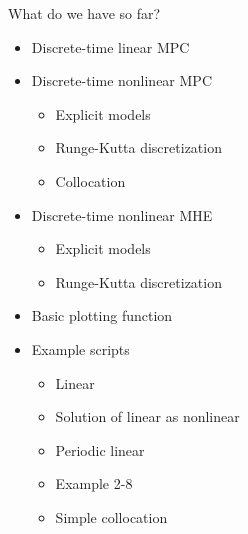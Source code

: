\documentclass[xcolor=dvipsnames]{beamer}
\begin{document}
\begin{frame}{What do we have so far?}
    \begin{itemize}
        \item Discrete-time linear MPC
        \item Discrete-time nonlinear MPC
        \begin{itemize}
            \item Explicit models
            \item Runge-Kutta discretization
            \item Collocation
        \end{itemize}
        \item Discrete-time nonlinear MHE
        \begin{itemize}
            \item Explicit models
            \item Runge-Kutta discretization
        \end{itemize}
        \item Basic plotting function
        \item Example scripts
        \begin{itemize}
            \item Linear
            \item Solution of linear as nonlinear
            \item Periodic linear
            \item Example 2-8
            \item Simple collocation
        \end{itemize}
    \end{itemize}
    
\end{frame}
\end{document}
